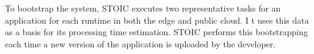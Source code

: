 To bootstrap the system, STOIC executes two representative tasks 
for an application for each runtime in both the edge and public cloud.  I
t uses this data 
as a basis for its processing time estimation.  STOIC 
performs this bootstrapping each time a new version of the application
is uploaded by the developer.




